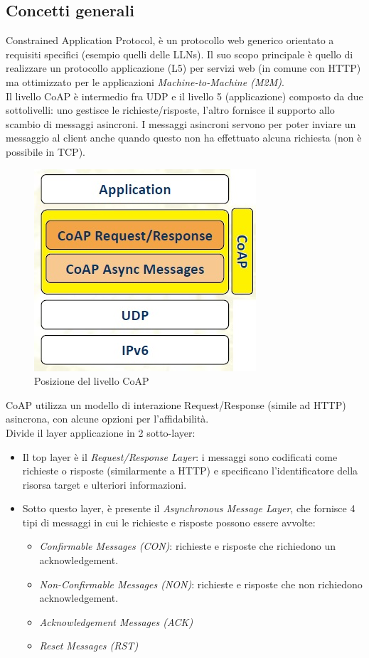 \documentclass{article}
\begin{document}
\subsection{Concetti generali}
Constrained Application Protocol, è un protocollo web generico orientato a requisiti specifici (esempio quelli delle LLNs). Il suo scopo principale è quello di realizzare un protocollo applicazione (L5) per servizi web (in comune con HTTP) ma ottimizzato per le applicazioni \textit{Machine-to-Machine (M2M)}.\\
Il livello CoAP è intermedio fra UDP e il livello 5 (applicazione) composto da due sottolivelli: uno gestisce le richieste/risposte, l'altro fornisce il supporto allo scambio di messaggi asincroni. I messaggi asincroni servono per poter inviare un messaggio al client anche quando questo non ha effettuato alcuna richiesta (non è possibile in TCP).\\
\begin{figure}[H]
\centering
\includegraphics[scale=0.4]{figures/coaplayer.jpg}
\caption{Posizione del livello CoAP}
\end{figure}
CoAP utilizza un modello di interazione Request/Response (simile ad HTTP) asincrona, con alcune opzioni per l'affidabilità. \\ Divide il layer applicazione in 2 sotto-layer:
\begin{itemize}
    \item Il top layer è il \textit{Request/Response Layer}: i messaggi sono codificati come richieste o risposte (similarmente a HTTP) e specificano l'identificatore della risorsa target e ulteriori informazioni.
    \item Sotto questo layer, è presente il \textit{Asynchronous Message Layer}, che fornisce 4 tipi di messaggi in cui le richieste e risposte possono essere avvolte:
    \begin{itemize}
        \item \textit{Confirmable Messages (CON)}: richieste e risposte che richiedono un acknowledgement.
        \item \textit{Non-Confirmable Messages (NON)}: richieste e risposte che non richiedono acknowledgement.
        \item \textit{Acknowledgement Messages (ACK)}
        \item \textit{Reset Messages (RST)}
    \end{itemize}
\end{itemize}
\end{document}
